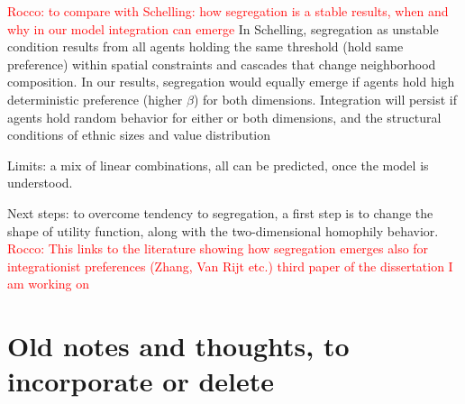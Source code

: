 \documentclass{article}
\newcommand{\rocco}[1]{{\textcolor{red}{Rocco: #1}}} %
\begin{document}
\rocco{to compare with Schelling: how segregation is a stable results, when and why in our model integration can emerge}
In Schelling, segregation as unstable condition results from all agents holding the same threshold (hold same preference) within spatial constraints and cascades that change neighborhood composition. In our results, segregation would equally emerge if agents hold high deterministic preference (higher $\beta$) for both dimensions. Integration will persist if agents hold random behavior for either or both dimensions, and the structural conditions of ethnic sizes and value distribution


Limits: a mix of linear combinations, all can be predicted, once the model is understood.


Next steps: to overcome tendency to segregation, a first step is to change the shape of utility function, along with the two-dimensional homophily behavior. \rocco{This links to the literature showing how segregation emerges also for integrationist preferences (Zhang, Van Rijt etc.) third paper of the dissertation I am working on}



\section*{Old notes and thoughts, to incorporate or delete}
\end{document}
